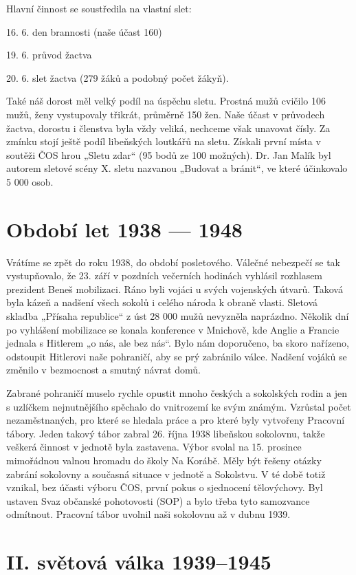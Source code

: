 Hlavní činnost se soustředila na vlastní slet:

16. 6. den brannosti (naše účast 160)

19. 6. průvod žactva

20. 6. slet žactva (279 žáků a podobný počet žákyň).

Také náš dorost měl velký podíl na úspěchu sletu. Prostná mužů cvičilo
106 mužů, ženy vystupovaly třikrát, průměrně 150 žen. Naše účast v
průvodech žactva, dorostu i členstva byla vždy veliká, nechceme však
unavovat čísly. Za zmínku stojí ještě podíl libeňských loutkářů na
sletu. Získali první místa v soutěži ČOS hrou „Sletu zdar`` (95 bodů ze
100 možných). Dr. Jan Malík byl autorem sletové scény X. sletu nazvanou
„Budovat a bránit``, ve které účinkovalo 5 000 osob.

\section{Období let 1938 --- 1948}\label{obdobuxed-let-1938-1948}

Vrátíme se zpět do roku 1938, do období posletového. Válečné nebezpečí
se tak vystupňovalo, že 23. září v pozdních večerních hodinách vyhlásil
rozhlasem prezident Beneš mobilizaci. Ráno byli vojáci u svých
vojenských útvarů. Taková byla kázeň a nadšení všech sokolů i celého
národa k obraně vlasti. Sletová skladba „Přísaha republice`` z úst 28
000 mužů nevyzněla naprázdno. Několik dní po vyhlášení mobilizace se
konala konference v Mnichově, kde Anglie a Francie jednala s Hitlerem „o
nás, ale bez nás``. Bylo nám doporučeno, ba skoro nařízeno, odstoupit
Hitlerovi naše pohraničí, aby se prý zabránilo válce. Nadšení vojáků se
změnilo v bezmocnost a smutný návrat domů.

Zabrané pohraničí muselo rychle opustit mnoho českých a sokolských rodin
a jen s uzlíčkem nejnutnějšího spěchalo do vnitrozemí ke svým známým.
Vzrůstal počet nezaměstnaných, pro které se hledala práce a pro které
byly vytvořeny Pracovní tábory. Jeden takový tábor zabral 26. října 1938
libeňskou sokolovnu, takže veškerá činnost v jednotě byla zastavena.
Výbor svolal na 15. prosince mimořádnou valnou hromadu do školy Na
Korábě. Měly být řešeny otázky zabrání sokolovny a současná situace v
jednotě a Sokolstvu. V té době totiž vznikal, bez účasti výboru ČOS,
první pokus o sjednocení tělovýchovy. Byl ustaven Svaz občanské
pohotovosti (SOP) a bylo třeba tyto samozvance odmítnout. Pracovní tábor
uvolnil naši sokolovnu až v dubnu 1939.

\section{II. světová válka
1939--1945}\label{ii.-svux11btovuxe1-vuxe1lka-19391945}

